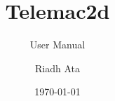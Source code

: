 \documentclass[Telemac2D]{../../data/TelemacDoc} %
\begin{document}
\let\cleardoublepage\clearpage

\title{Telemac2d}
\subtitle{User Manual}
\version{\telmaversion}
\author{Riadh Ata}
\date{\today}
\maketitle
\clearpage



\newpage

\thispagestyle{empty}

\TelemacCopyright{}




\pagestyle{empty} %

\tableofcontents%


\pagestyle{fancy} %
\end{document}
